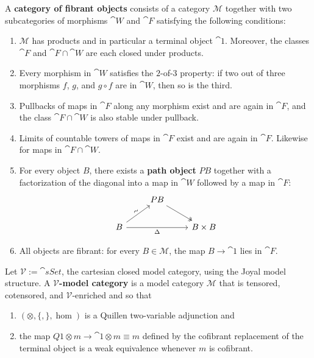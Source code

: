 \begin{defn}
    A \textbf{category of fibrant objects} consists of a category $\mathcal{M}$ together with two subcategories of morphisms $\cat{W}$ and $\cat{F}$ satisfying the following conditions:
    \begin{enumerate}
        \item $\mathcal{M}$ has products and in particular a terminal object $\cat{1}$. Moreover, the classes $\cat{F}$ and $\cat{F}\cap\cat{W}$ are each closed under products.
        \item Every morphism in $\cat{W}$ satisfies the $2$-of-$3$ property: if two out of three morphisms $f$, $g$, and $g\circ f$ are in $\cat{W}$, then so is the third.
        \item Pullbacks of maps in $\cat{F}$ along any morphism exist and are again in $\cat{F}$, and the class $\cat{F}\cap\cat{W}$ is also stable under pullback.
        \item Limits of countable towers of maps in $\cat{F}$ exist and are again in $\cat{F}$. Likewise for maps in $\cat{F}\cap\cat{W}$.
        \item For every object $B$, there exists a \textbf{path object} $PB$ together with a factorization of the diagonal into a map in $\cat{W}$ followed by a map in $\cat{F}$:
        \[
        \begin{tikzcd}
            {} & PB \arrow[dr, two heads] & \\
            B \arrow[ur, "\sim" {sloped}] \arrow[rr, "\Delta"'] & {} & B \times B
        \end{tikzcd}
        \]
        \item All objects are fibrant: for every $B\in \mathcal{M}$, the map $B \to \cat{1}$ lies in $\cat{F}$.
    \end{enumerate} 
\end{defn}
\begin{defn}
    Let $\mathcal{V}:=\cat{sSet}$, the cartesian closed model category, using the Joyal model structure. A \textbf{$\mathcal{V}$-model category} is a model category $\mathcal{M}$ that is tensored, cotensored, and $\mathcal{V}$-enriched and so that
    \begin{enumerate}
        \item $(\otimes,\{,\},\hom)$ is a Quillen two-variable adjunction and
        \item the map $Q1\otimes m \rightarrow \cat{1}\otimes m \equiv m$ defined by the cofibrant replacement of the terminal object is a weak equivalence whenever $m$ is cofibrant.
    \end{enumerate}
\end{defn}

